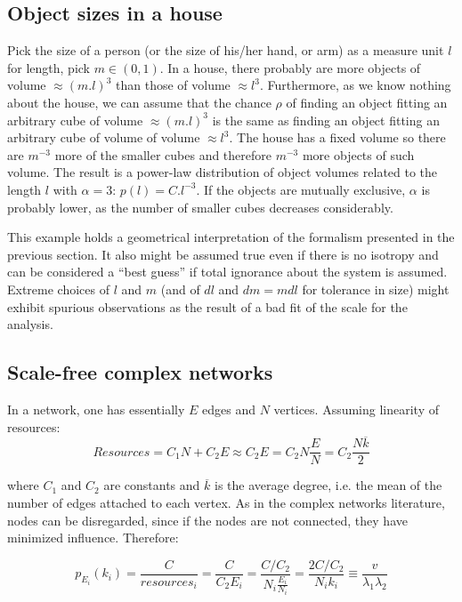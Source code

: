 \documentclass[10pt,letterpaper]{article}
\begin{document}
\subsection{Object sizes in a house}\label{sec:siz}
Pick the size of a person (or the size of his/her hand, or  arm)
as a measure unit $l$ for length, pick $m \in (0,1)$.
In a house, there probably are more objects
of volume $\approx (m.l)^3$ 
than those of volume $\approx l^3$.
Furthermore, as we know nothing about the house,
we can assume that the chance $\rho$ of finding an object
fitting an arbitrary cube of volume $\approx (m.l)^3$
is the same as finding an object fitting an
arbitrary cube of volume of volume $\approx l^3$.
The house has a fixed volume so there are $m^{-3}$ more of
the smaller cubes and therefore $m^{-3}$ more objects of such
volume. 
The result is a power-law distribution of object volumes
related to the length $l$ with $\alpha=3$:
$p(l)=C.l^{-3}$.
If the objects are mutually exclusive,
$\alpha$ is probably lower, as the number of smaller
cubes decreases considerably.

This example holds a geometrical
interpretation of the formalism presented in the previous section.
It also might be assumed true even if there is no isotropy
and can be considered a ``best guess'' if total ignorance
about the system is assumed. 
Extreme choices of $l$ and $m$ (and of $dl$ and $dm=mdl$ for tolerance in size)
might exhibit spurious observations
as the result of a bad fit of the scale for the analysis.

\subsection{Scale-free complex networks}

In a network, one has essentially $E$ edges and $N$ vertices.
Assuming linearity of resources:
\begin{equation}\label{eq:nre}
	Resources=C_1 N + C_2 E \approx C_2 E = C_2 N \frac{E}{N} = C_2 \frac{N \overline{k}}{2}
\end{equation}

\noindent where $C_1$ and $C_2$ are constants and $\overline{k}$ is
the average degree, i.e. the mean of the number of edges attached to each vertex.
As in the complex networks literature, nodes can be disregarded, since if the nodes
are not connected, they have minimized influence.
Therefore:

\begin{equation}\label{eq:eqf}
	p_{E_i}(k_i)=\frac{C}{resources_i}=\frac{C}{C_2 E_i}=\frac{C/C_2}{N_i \frac{E_i}{N_i}}=\frac{2C/C_2}{N_i k_i} \equiv \frac{v}{\lambda_1   \lambda_2}
\end{equation}
\end{document}
